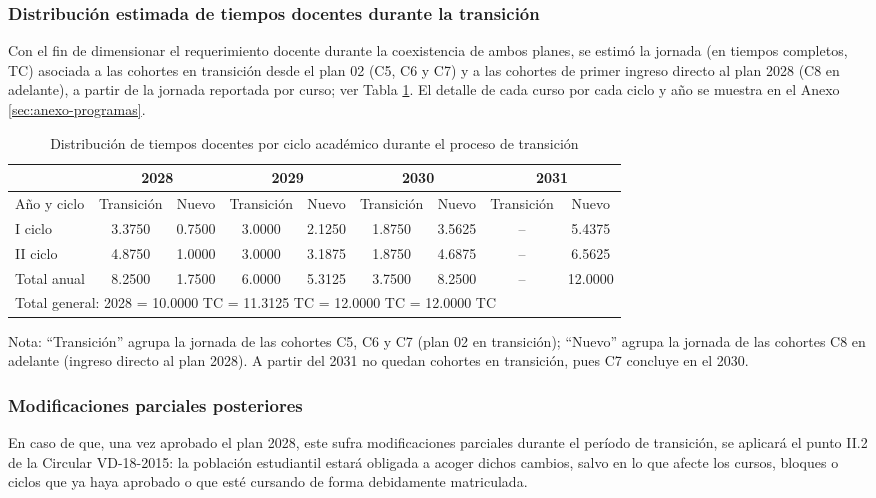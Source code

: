 \subsubsection{Distribución estimada de tiempos docentes durante la transición}

Con el fin de dimensionar el requerimiento docente durante la coexistencia de ambos planes, se estimó la jornada (en tiempos completos, TC) asociada a las cohortes en transición desde el plan 02 (C5, C6 y C7) y a las cohortes de primer ingreso directo al plan 2028 (C8 en adelante), a partir de la jornada reportada por curso; ver Tabla \ref{tab:tiempos-docentes}. El detalle de cada curso por cada ciclo y año se muestra en el Anexo \ref{sec:anexo-programas}.

\begin{table}[h!]
\centering
\caption{Distribución de tiempos docentes por ciclo académico durante el proceso de transición}
\label{tab:tiempos-docentes}
\small
\begin{tabular}{|l|c|c|c|c|c|c|c|c|}
\hline
\rowcolor[HTML]{00C0F3}
 & \multicolumn{2}{c|}{2028} & \multicolumn{2}{c|}{2029} & \multicolumn{2}{c|}{2030} & \multicolumn{2}{c|}{2031} \\ \hline
\rowcolor[HTML]{00C0F3}
Año y ciclo & Transición & Nuevo & Transición & Nuevo & Transición & Nuevo & Transición & Nuevo \\ \hline
I ciclo & 3.3750 & 0.7500 & 3.0000 & 2.1250 & 1.8750 & 3.5625 & -- & 5.4375 \\ \hline
II ciclo & 4.8750 & 1.0000 & 3.0000 & 3.1875 & 1.8750 & 4.6875 & -- & 6.5625 \\ \hline
Total anual & 8.2500 & 1.7500 & 6.0000 & 5.3125 & 3.7500 & 8.2500 & -- & 12.0000 \\ \hline
\multicolumn{9}{|l|}{Total general: 2028 = 10.0000 TC \quad 2029 = 11.3125 TC \quad 2030 = 12.0000 TC \quad 2031 = 12.0000 TC} \\ \hline
\end{tabular}
\vspace{0.3em}
{\small Nota: ``Transición'' agrupa la jornada de las cohortes C5, C6 y C7 (plan 02 en transición); ``Nuevo'' agrupa la jornada de las cohortes C8 en adelante (ingreso directo al plan 2028). A partir del 2031 no quedan cohortes en transición, pues C7 concluye en el 2030.}
\end{table}


\subsubsection{Modificaciones parciales posteriores}
En caso de que, una vez aprobado el plan 2028, este sufra modificaciones parciales durante el período de transición, se aplicará el punto II.2 de la Circular VD-18-2015: la población estudiantil estará obligada a acoger dichos cambios, salvo en lo que afecte los cursos, bloques o ciclos que ya haya aprobado o que esté cursando de forma debidamente matriculada.

